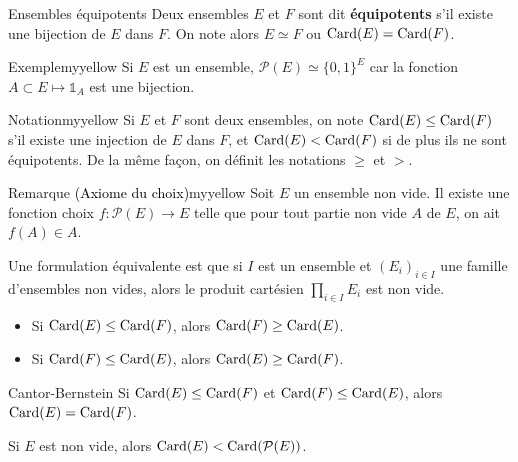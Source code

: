     \begin{defi}{Ensembles équipotents}{}
        Deux ensembles $E$ et $F$ sont dit \textbf{équipotents} s’il existe une bijection de $E$ dans $F$. On note alors $E \simeq F$ ou $\operatorname{Card}(E) = \operatorname{Card}(F)$.
    \end{defi}

    \begin{omed}{Exemple}{myyellow}
        Si $E$ est un ensemble, $\mathcal{P}(E) \simeq \big\{ 0,1 \big\}^E$ car la fonction $A \subset E \mapsto \mathbb{1}_A$ est une bijection.
    \end{omed}

    \begin{omed}{Notation}{myyellow}
        Si $E$ et $F$ sont deux ensembles, on note $\operatorname{Card}(E) \leq \operatorname{Card}(F)$ s’il existe une injection de $E$ dans $F$, et $\operatorname{Card}(E) < \operatorname{Card}(F)$ si de plus ils ne sont équipotents. De la même façon, on définit les notations $\geq$ et $>$.
    \end{omed}

    \begin{omed}{Remarque \textcolor{black}{(Axiome du choix)}}{myyellow}
        Soit $E$ un ensemble non vide. Il existe une fonction choix $f : \mathcal{P}(E) \to E$ telle que pour tout partie non vide $A$ de $E$, on ait $f(A) \in A$. 
        
        Une formulation équivalente est que si $I$ est un ensemble et $(E_i)_{i \in I}$ une famille d’ensembles non vides, alors le produit cartésien $\prod_{i \in I} E_i$ est non vide.
    \end{omed}

    \begin{prop}{}{}
        \begin{itemize}
            \item Si $\operatorname{Card}(E) \leq \operatorname{Card}(F)$, alors $\operatorname{Card}(F) \geq \operatorname{Card}(E)$.
            \item Si $\operatorname{Card}(F) \leq \operatorname{Card}(E)$, alors $\operatorname{Card}(E) \geq \operatorname{Card}(F)$.
        \end{itemize}
    \end{prop}

    \begin{theo}{Cantor-Bernstein}{}
        Si $\operatorname{Card}(E) \leq \operatorname{Card}(F)$ et $\operatorname{Card}(F) \leq \operatorname{Card}(E)$, alors $\operatorname{Card}(E) = \operatorname{Card}(F)$.
    \end{theo}

    \begin{prop}{}{}
        Si $E$ est non vide, alors $\operatorname{Card}(E) < \operatorname{Card}(\mathcal{P}(E))$.
    \end{prop}

